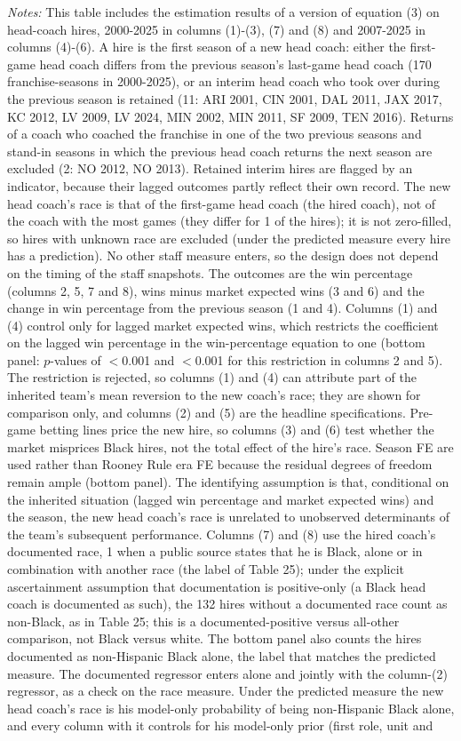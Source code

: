 {\footnotesize
\noindent\textit{Notes:} This table includes the estimation results of a version of equation (3) on head-coach hires, 2000-2025 in columns (1)-(3), (7) and (8) and 2007-2025 in columns (4)-(6). A hire is the first season of a new head coach: either the first-game head coach differs from the previous season's last-game head coach (170 franchise-seasons in 2000-2025), or an interim head coach who took over during the previous season is retained (11: ARI 2001, CIN 2001, DAL 2011, JAX 2017, KC 2012, LV 2009, LV 2024, MIN 2002, MIN 2011, SF 2009, TEN 2016). Returns of a coach who coached the franchise in one of the two previous seasons and stand-in seasons in which the previous head coach returns the next season are excluded (2: NO 2012, NO 2013). Retained interim hires are flagged by an indicator, because their lagged outcomes partly reflect their own record. The new head coach's race is that of the first-game head coach (the hired coach), not of the coach with the most games (they differ for 1 of the hires); it is not zero-filled, so hires with unknown race are excluded (under the predicted measure every hire has a prediction). No other staff measure enters, so the design does not depend on the timing of the staff snapshots. The outcomes are the win percentage (columns 2, 5, 7 and 8), wins minus market expected wins (3 and 6) and the change in win percentage from the previous season (1 and 4). Columns (1) and (4) control only for lagged market expected wins, which restricts the coefficient on the lagged win percentage in the win-percentage equation to one (bottom panel: $p$-values of $<$0.001 and $<$0.001 for this restriction in columns 2 and 5). The restriction is rejected, so columns (1) and (4) can attribute part of the inherited team's mean reversion to the new coach's race; they are shown for comparison only, and columns (2) and (5) are the headline specifications. Pre-game betting lines price the new hire, so columns (3) and (6) test whether the market misprices Black hires, not the total effect of the hire's race. Season FE are used rather than Rooney Rule era FE because the residual degrees of freedom remain ample (bottom panel). The identifying assumption is that, conditional on the inherited situation (lagged win percentage and market expected wins) and the season, the new head coach's race is unrelated to unobserved determinants of the team's subsequent performance. Columns (7) and (8) use the hired coach's documented race, 1 when a public source states that he is Black, alone or in combination with another race (the label of Table 25); under the explicit ascertainment assumption that documentation is positive-only (a Black head coach is documented as such), the 132 hires without a documented race count as non-Black, as in Table 25; this is a documented-positive versus all-other comparison, not Black versus white. The bottom panel also counts the hires documented as non-Hispanic Black alone, the label that matches the predicted measure. The documented regressor enters alone and jointly with the column-(2) regressor, as a check on the race measure. Under the predicted measure the new head coach's race is his model-only probability of being non-Hispanic Black alone, and every column with it controls for his model-only prior (first role, unit and }
